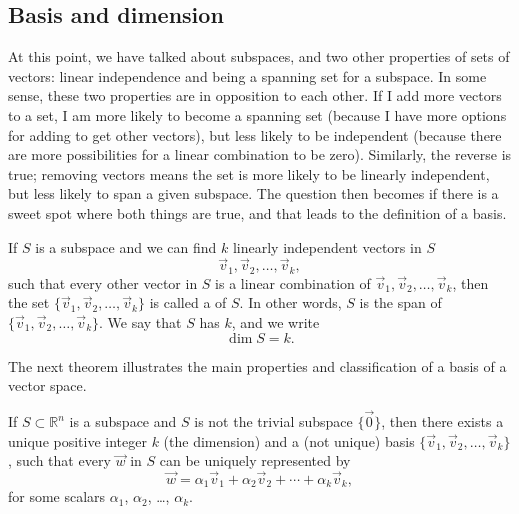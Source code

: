 \subsection{Basis and dimension}

At this point, we have talked about subspaces, and two other properties of sets of vectors: linear independence and being a spanning set for a subspace. In some sense, these two properties are in opposition to each other. If I add more vectors to a set, I am more likely to become a spanning set (because I have more options for adding to get other vectors), but less likely to be independent (because there are more possibilities for a linear combination to be zero). Similarly, the reverse is true; removing vectors means the set is more likely to be linearly independent, but less likely to span a given subspace. The question then becomes if there is a sweet spot where both things are true, and that leads to the definition of a basis.

\begin{definition}\label{def:basis-dim}
If $S$ is a subspace and we can find $k$ linearly independent vectors in $S$
\begin{equation*}
\vec{v}_1, \vec{v}_2, \ldots, \vec{v}_k ,
\end{equation*}
such that every other vector in $S$ is a linear combination of $\vec{v}_1,
\vec{v}_2,\ldots, \vec{v}_k$,
then the set 
$\{ \vec{v}_1, \vec{v}_2, \ldots, \vec{v}_k \}$ is called a
\emph{} of $S$.  In other words, $S$
is the span of 
$\{ \vec{v}_1, \vec{v}_2, \ldots, \vec{v}_k \}$.
We say that $S$ has \emph{} $k$,
and we write 
\begin{equation*}
\dim S = k .
\end{equation*}
\end{definition}

The next theorem illustrates the main properties and classification of a basis of a vector space.

\begin{theorem1}{}
If $S \subset {\mathbb R}^n$ is a subspace and $S$ is not the trivial
subspace $\{ \vec{0} \}$, then there exists a
unique positive integer $k$ (the dimension) and a (not unique)
basis
$\{ \vec{v}_1, \vec{v}_2, \ldots, \vec{v}_k \}$, such that every
$\vec{w}$ in $S$ can be uniquely represented by
\begin{equation*}
\vec{w} = 
\alpha_1 \vec{v}_1 + 
\alpha_2 \vec{v}_2 + 
\cdots
+
\alpha_k \vec{v}_k ,
\end{equation*}
for some scalars $\alpha_1$, $\alpha_2$, \ldots, $\alpha_k$.
\end{theorem1}

